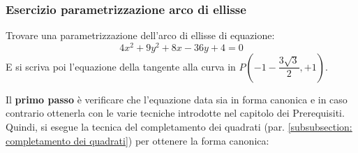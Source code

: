 \documentclass[a4paper]{article}
\begin{document}
	\subsubsection{Esercizio parametrizzazione arco di ellisse}\label{subsubsection: esercizio parametrizzazione arco di ellisse}
	
	Trovare una parametrizzazione dell'arco di ellisse di equazione:
	\begin{equation*}
		4x^{2} + 9y^{2} + 8x - 36y + 4 = 0
	\end{equation*}
	E si scriva poi l'equazione della tangente alla curva in $P\left(-1 - \dfrac{3\sqrt{3}}{2}, +1\right)$.
	
	\noindent
	Il \textbf{primo passo} è verificare che l'equazione data sia in forma canonica e in caso contrario ottenerla con le varie tecniche introdotte nel capitolo dei Prerequisiti. Quindi, si esegue la tecnica del completamento dei quadrati (par. \ref{subsubsection: completamento dei quadrati}) per ottenere la forma canonica:
\end{document}
